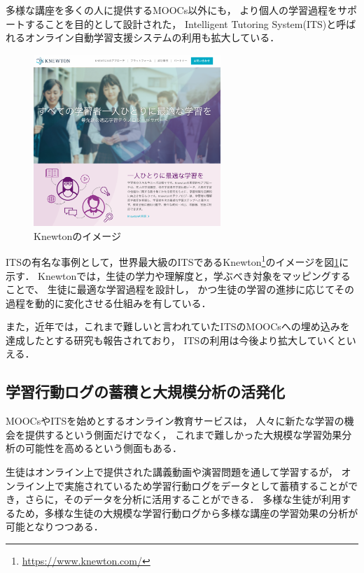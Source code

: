 多様な講座を多くの人に提供するMOOCs以外にも，
より個人の学習過程をサポートすることを目的として設計された，
Intelligent Tutoring System(ITS)と呼ばれるオンライン自動学習支援システムの利用も拡大している．

\begin{figure}[htb]
\begin{center}
\includegraphics[width=200pt]{./img/knewton.png}
\end{center}
\caption{Knewtonのイメージ}
\label{fig:knewton}
\end{figure}

ITSの有名な事例として，世界最大級のITSであるKnewton\footnote{\url{https://www.knewton.com/}}のイメージを図\ref{fig:knewton}に示す．
Knewtonでは，生徒の学力や理解度と，学ぶべき対象をマッピングすることで、
生徒に最適な学習過程を設計し，
かつ生徒の学習の進捗に応じてその過程を動的に変化させる仕組みを有している\cite{upbin2012knewton}．


また，近年では，これまで難しいと言われていたITSのMOOCsへの埋め込みを達成したとする研究\cite{aleven2015beginning}も報告されており，
ITSの利用は今後より拡大していくといえる．



\subsection{学習行動ログの蓄積と大規模分析の活発化}

MOOCsやITSを始めとするオンライン教育サービスは，
人々に新たな学習の機会を提供するという側面だけでなく，
これまで難しかった大規模な学習効果分析の可能性を高めるという側面もある．

生徒はオンライン上で提供された講義動画や演習問題を通して学習するが，
オンライン上で実施されているため学習行動ログをデータとして蓄積することができ，さらに，そのデータを分析に活用することができる．
多様な生徒が利用するため，多様な生徒の大規模な学習行動ログから多様な講座の学習効果の分析が可能となりつつある．

